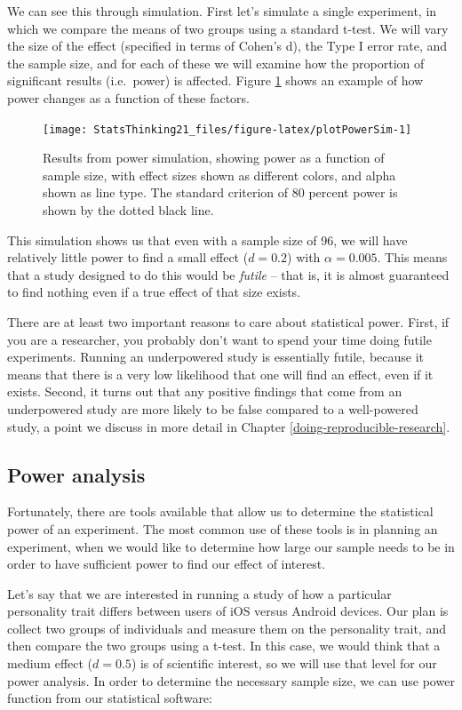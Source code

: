 \documentclass[
  12pt,
]{book}
\begin{document}
We can see this through simulation. First let's simulate a single experiment, in which we compare the means of two groups using a standard t-test. We will vary the size of the effect (specified in terms of Cohen's d), the Type I error rate, and the sample size, and for each of these we will examine how the proportion of significant results (i.e.~power) is affected. Figure \ref{fig:plotPowerSim} shows an example of how power changes as a function of these factors.

\begin{figure}
\texttt{[image: StatsThinking21\_files/figure-latex/plotPowerSim-1]} \caption{Results from power simulation, showing power as a function of sample size, with effect sizes shown as different colors, and alpha shown as line type. The standard criterion of 80 percent power is shown by the dotted black line.}\label{fig:plotPowerSim}
\end{figure}

This simulation shows us that even with a sample size of 96, we will have relatively little power to find a small effect (\(d = 0.2\)) with \(\alpha = 0.005\). This means that a study designed to do this would be \emph{futile} -- that is, it is almost guaranteed to find nothing even if a true effect of that size exists.

There are at least two important reasons to care about statistical power. First, if you are a researcher, you probably don't want to spend your time doing futile experiments. Running an underpowered study is essentially futile, because it means that there is a very low likelihood that one will find an effect, even if it exists. Second, it turns out that any positive findings that come from an underpowered study are more likely to be false compared to a well-powered study, a point we discuss in more detail in Chapter \ref{doing-reproducible-research}.

\hypertarget{power-analysis}{%
\subsection{Power analysis}\label{power-analysis}}

Fortunately, there are tools available that allow us to determine the statistical power of an experiment. The most common use of these tools is in planning an experiment, when we would like to determine how large our sample needs to be in order to have sufficient power to find our effect of interest.

Let's say that we are interested in running a study of how a particular personality trait differs between users of iOS versus Android devices. Our plan is collect two groups of individuals and measure them on the personality trait, and then compare the two groups using a t-test. In this case, we would think that a medium effect (\(d = 0.5\)) is of scientific interest, so we will use that level for our power analysis. In order to determine the necessary sample size, we can use power function from our statistical software:
\end{document}
